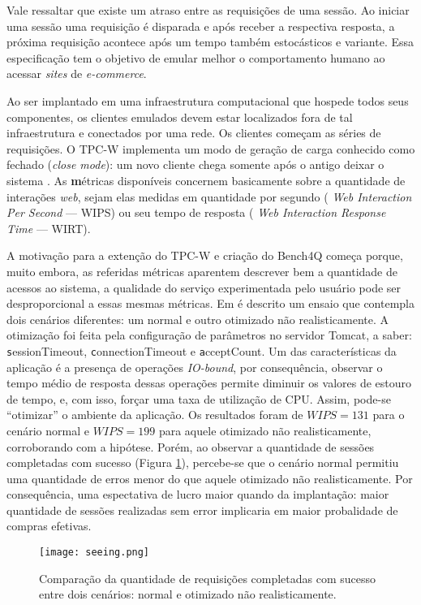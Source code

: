 Vale ressaltar que existe um atraso entre as requisições de uma sessão. Ao iniciar uma sessão uma requisição é disparada e após receber a respectiva resposta, a próxima requisição acontece após um tempo também estocásticos e variante. Essa especificação tem o objetivo de emular melhor o comportamento humano ao acessar \textit{sites} de \textit{ e-commerce}.

Ao ser implantado em uma infraestrutura computacional que hospede todos seus componentes, os clientes emulados devem estar localizados fora de tal infraestrutura e conectados por uma rede. Os clientes começam as séries de requisições. O TPC-W implementa um modo de geração de carga conhecido como fechado (\textit{close mode}): um novo cliente chega somente após o antigo deixar o sistema \cite{Zhang2011}. As {\textbf métricas disponíveis} concernem basicamente sobre a quantidade de interações \textit{web}, sejam elas medidas em quantidade por segundo (\textit{ Web Interaction Per Second} --- WIPS) ou seu tempo de resposta (\textit{ Web Interaction Response Time} --- WIRT).

A motivação para a extenção do TPC-W e criação do Bench4Q começa porque, muito embora, as referidas métricas aparentem descrever bem a quantidade de acessos ao sistema, a qualidade do serviço experimentada pelo usuário pode ser desproporcional a essas mesmas métricas. Em \cite{bench4qslides} é descrito um ensaio que contempla dois cenários diferentes: um normal e outro otimizado não realisticamente. A otimização foi feita pela configuração de parâmetros no servidor Tomcat, a saber: {\texttt sessionTimeout}, {\texttt connectionTimeout} e {\texttt acceptCount}. Um das características da aplicação é a presença de operações \textit{ IO-bound}, por consequência, observar o tempo médio de resposta dessas operações permite diminuir os valores de estouro de tempo, e, com isso, forçar uma taxa de utilização de CPU. Assim, pode-se ``otimizar'' o ambiente da aplicação. Os resultados foram de $WIPS = 131$ para o cenário normal e $WIPS=199$ para aquele otimizado não realisticamente, corroborando com a hipótese. Porém, ao observar a quantidade de sessões completadas com sucesso (Figura \ref{fig:seeing}), percebe-se que o cenário normal permitiu uma quantidade de erros menor do que aquele otimizado não realisticamente. Por consequência, uma espectativa de lucro maior quando da implantação: maior quantidade de sessões realizadas sem error implicaria em maior probalidade de compras efetivas.

\begin{figure}[htb]
	\caption{Comparação da quantidade de requisições completadas com sucesso entre dois cenários: normal e otimizado não realisticamente.}
	\label{fig:seeing}
	\centering
	\texttt{[image: seeing.png]}
\end{figure}


